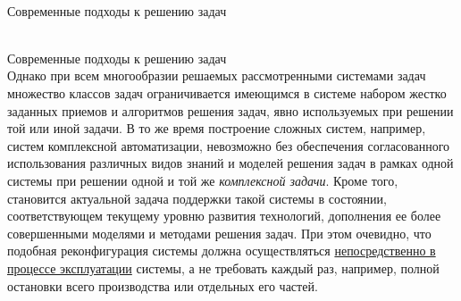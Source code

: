 \begin{frame}{\\Современные подходы к решению задач}
	\topline
	\justifying
	\vspace*{\fill}\\
	\footnotesize{
		\begin{SCn}
		\end{SCn}
	}
	
\end{frame}

\begin{frame}{\\Современные подходы к решению задач}
	\topline
	\justifying
	\vspace*{\fill}\\
	Однако при всем многообразии решаемых рассмотренными системами задач множество классов задач ограничивается имеющимся в системе набором жестко заданных приемов и алгоритмов решения задач, явно используемых при решении той или иной задачи. В то же время построение сложных систем, например, систем комплексной автоматизации, невозможно без обеспечения согласованного использования различных видов знаний и моделей решения задач в рамках одной системы при решении одной и той же \textit{комплексной задачи}. Кроме того, становится актуальной задача поддержки такой системы в состоянии, соответствующем текущему уровню развития технологий, дополнения ее более совершенными моделями и методами решения задач. При этом очевидно, что подобная реконфигурация системы должна осуществляться \underline{непосредственно в процессе эксплуатации} системы, а не требовать каждый раз, например, полной остановки всего производства или отдельных его частей.
\end{frame}


